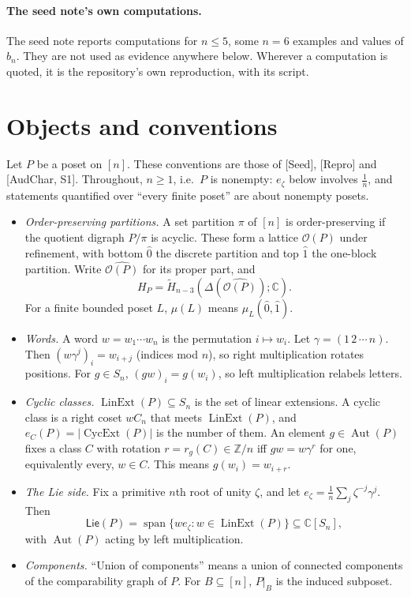 \documentclass[11pt]{article}
\theoremstyle{definition}
\theoremstyle{remark}
\newcommand{\OP}{\mathcal O}
\newcommand{\Lin}{\operatorname{LinExt}}
\newcommand{\Aut}{\operatorname{Aut}}
\newcommand{\Cyc}{\operatorname{CycExt}}
\newcommand{\PLie}{\mathsf{Lie}}
\begin{document}
\paragraph{The seed note's own computations.} The seed note reports
computations for $n\le5$, some $n=6$ examples and values of $b_n$. They are
not used as evidence anywhere below. Wherever a computation is quoted, it is
the repository's own reproduction, with its script.

\section{Objects and conventions}\label{sec:setup}

Let $P$ be a poset on $[n]$. These conventions are those of [Seed], [Repro]
and [AudChar, S1]. Throughout, $n\ge1$, i.e.\ $P$ is nonempty: $e_\zeta$
below involves $\frac1n$, and statements quantified over ``every finite
poset'' are about nonempty posets.

\begin{itemize}
\item \emph{Order-preserving partitions.} A set partition $\pi$ of $[n]$ is
  order-preserving if the quotient digraph $P/\pi$ is acyclic. These form a
  lattice $\OP(P)$ under refinement, with bottom $\hat0$ the discrete
  partition and top $\hat1$ the one-block partition. Write $\widehat{\OP(P)}$
  for its proper part, and
  \[
  H_P=\widetilde H_{n-3}(\Delta(\widehat{\OP(P)});\mathbb C).
  \]
  For a finite bounded poset $L$, $\mu(L)$ means $\mu_L(\hat0,\hat1)$.
\item \emph{Words.} A word $w=w_1\cdots w_n$ is the permutation
  $i\mapsto w_i$. Let $\gamma=(1\,2\,\cdots\,n)$. Then $(w\gamma^j)_i=w_{i+j}$
  (indices mod $n$), so right multiplication rotates positions. For
  $g\in S_n$, $(gw)_i=g(w_i)$, so left multiplication relabels letters.
\item \emph{Cyclic classes.} $\Lin(P)\subseteq S_n$ is the set of linear
  extensions. A cyclic class is a right coset $wC_n$ that meets $\Lin(P)$,
  and $e_C(P)=|\Cyc(P)|$ is the number of them. An element $g\in\Aut(P)$
  fixes a class $C$ with rotation $r=r_g(C)\in\mathbb Z/n$ iff $gw=w\gamma^r$
  for one, equivalently every, $w\in C$. This means $g(w_i)=w_{i+r}$.
\item \emph{The Lie side.} Fix a primitive $n$th root of unity $\zeta$, and
  let $e_\zeta=\frac1n\sum_j\zeta^{-j}\gamma^j$. Then
  \[
  \PLie(P)=\operatorname{span}\{we_\zeta:w\in\Lin(P)\}\subseteq\mathbb C[S_n],
  \]
  with $\Aut(P)$ acting by left multiplication.
\item \emph{Components.} ``Union of components'' means a union of connected
  components of the comparability graph of $P$. For $B\subseteq[n]$, $P|_B$
  is the induced subposet.
\end{itemize}
\end{document}

